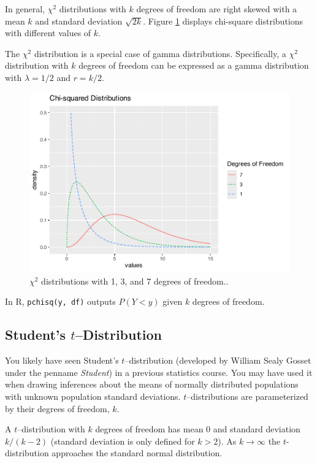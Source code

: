 \documentclass[
]{krantz}
\begin{document}
In general, \(\chi^2\) distributions with \(k\) degrees of freedom are right skewed with a mean \(k\) and standard deviation \(\sqrt{2k}\). Figure \ref{fig:multChisq} displays chi-square distributions with different values of \(k\).

The \(\chi^2\) distribution is a special case of gamma distributions. Specifically, a \(\chi^2\) distribution with \(k\) degrees of freedom can be expressed as a gamma distribution with \(\lambda = 1/2\) and \(r = k/2\).



\begin{figure}

{\centering \includegraphics[width=0.6\linewidth]{bookdown-BeyondMLR_files/figure-latex/multChisq-1} 

}

\caption{\(\chi^2\) distributions with 1, 3, and 7 degrees of freedom..}\label{fig:multChisq}
\end{figure}

In R, \texttt{pchisq(y,\ df)} outputs \(P(Y < y)\) given \(k\) degrees of freedom.

\hypertarget{students-tdistribution}{%
\subsection{\texorpdfstring{Student's \(t\)--Distribution}{Student's t--Distribution}}\label{students-tdistribution}}

You likely have seen Student's \(t\)--distribution  (developed by William Sealy Gosset under the penname \emph{Student}) in a previous statistics course. You may have used it when drawing inferences about the means of normally distributed populations with unknown population standard deviations. \(t\)--distributions are parameterized by their degrees of freedom, \(k\).

A \(t\)--distribution with \(k\) degrees of freedom has mean \(0\) and standard deviation \(k/(k-2)\) (standard deviation is only defined for \(k > 2\)). As \(k \rightarrow \infty\) the \(t\)-distribution approaches the standard normal distribution.
\end{document}
